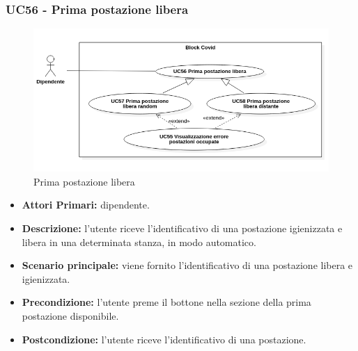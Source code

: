 \subsubsection{ UC56 - Prima postazione libera }
\begin{figure}[H]
	\centering
	\includegraphics[width=18cm]{res/images/UC55-56-57-58.png}
	\caption{Prima postazione libera}
	\label{fig:Prima postazione libera}
\end{figure}
\begin{itemize}
	\item\textbf{Attori Primari:} dipendente.
	\item\textbf{Descrizione:} l’utente riceve l'identificativo di una postazione igienizzata e libera in una determinata stanza, 
	in modo automatico.
	\item\textbf{Scenario principale:} viene fornito l'identificativo di una postazione libera e igienizzata.
	\item\textbf{Precondizione:} l’utente preme il bottone nella sezione della prima postazione disponibile.
	\item\textbf{Postcondizione:} l’utente riceve l'identificativo di una postazione.
\end{itemize}
